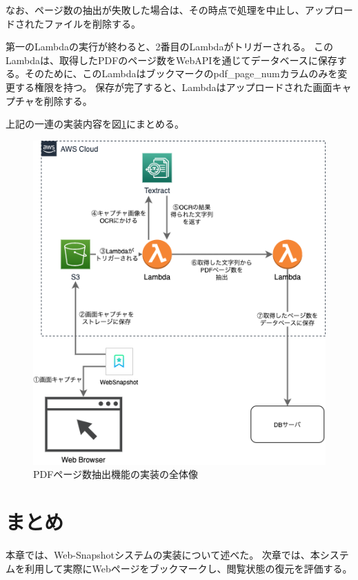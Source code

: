 なお、ページ数の抽出が失敗した場合は、その時点で処理を中止し、アップロードされたファイルを削除する。

第一のLambdaの実行が終わると、2番目のLambdaがトリガーされる。
このLambdaは、取得したPDFのページ数をWebAPIを通じてデータベースに保存する。そのために、このLambdaはブックマークのpdf\_page\_numカラムのみを変更する権限を持つ。
保存が完了すると、Lambdaはアップロードされた画面キャプチャを削除する。

上記の一連の実装内容を図\ref{fig:impl-pdf-overall}にまとめる。

\begin{figure}[htbp]
  \caption{PDFページ数抽出機能の実装の全体像}
  \label{fig:impl-pdf-overall}
  \begin{center}
    \includegraphics[bb=0 0 480 532,width=12cm]{img/050_implementation/server/impl-pdf-overall.pdf}
  \end{center}
\end{figure}

\section{まとめ}
本章では、Web-Snapshotシステムの実装について述べた。
次章では、本システムを利用して実際にWebページをブックマークし、閲覧状態の復元を評価する。